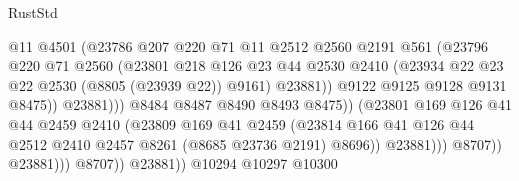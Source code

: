 \begin{lexlean}{RustStd}
\begin{coremodule}
                                      @11
                                      @4501
                                      (@23786
                                        @207
                                        @220
                                        @71
                                        @11
                                        @2512
                                        @2560
                                        @2191
                                        @561
                                        (@23796
                                          @220
                                          @71
                                          @2560
                                          (@23801
                                            @218
                                            @126
                                            @23
                                            @44
                                            @2530
                                            @2410
                                            (@23934 @22 @23 @22 @2530 (@8805 (@23939 @22)) @9161)
                                            @23881))
                                        @9122
                                        @9125
                                        @9128
                                        @9131
                                        @8475))
                                    @23881)))
                              @8484
                              @8487
                              @8490
                              @8493
                              @8475))
                          (@23801
                            @169
                            @126
                            @41
                            @44
                            @2459
                            @2410
                            (@23809
                              @169
                              @41
                              @2459
                              (@23814
                                @166
                                @41
                                @126
                                @44
                                @2512
                                @2410
                                @2457
                                @8261
                                (@8685 @23736 @2191)
                                @8696))
                            @23881)))
                      @8707))
                  @23881)))
            @8707))
        @23881))
    @10294
    @10297
    @10300

\end{coremodule}
\end{lexlean}
